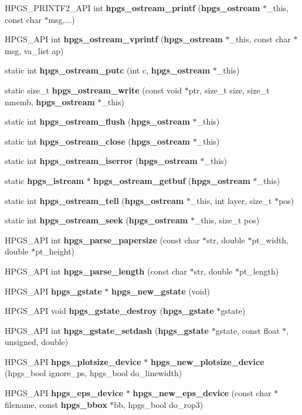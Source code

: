\begin{CompactItemize}
\item 
HPGS\_\-PRINTF2\_\-API int {\bf hpgs\_\-ostream\_\-printf} ({\bf hpgs\_\-ostream} $\ast$\_\-this, const char $\ast$msg,...)
\item 
HPGS\_\-API int {\bf hpgs\_\-ostream\_\-vprintf} ({\bf hpgs\_\-ostream} $\ast$\_\-this, const char $\ast$msg, va\_\-list ap)
\item 
static int {\bf hpgs\_\-ostream\_\-putc} (int c, {\bf hpgs\_\-ostream} $\ast$\_\-this)
\item 
static size\_\-t {\bf hpgs\_\-ostream\_\-write} (const void $\ast$ptr, size\_\-t size, size\_\-t nmemb, {\bf hpgs\_\-ostream} $\ast$\_\-this)
\item 
static int {\bf hpgs\_\-ostream\_\-flush} ({\bf hpgs\_\-ostream} $\ast$\_\-this)
\item 
static int {\bf hpgs\_\-ostream\_\-close} ({\bf hpgs\_\-ostream} $\ast$\_\-this)
\item 
static int {\bf hpgs\_\-ostream\_\-iserror} ({\bf hpgs\_\-ostream} $\ast$\_\-this)
\item 
static {\bf hpgs\_\-istream} $\ast$ {\bf hpgs\_\-ostream\_\-getbuf} ({\bf hpgs\_\-ostream} $\ast$\_\-this)
\item 
static int {\bf hpgs\_\-ostream\_\-tell} ({\bf hpgs\_\-ostream} $\ast$\_\-this, int layer, size\_\-t $\ast$pos)
\item 
static int {\bf hpgs\_\-ostream\_\-seek} ({\bf hpgs\_\-ostream} $\ast$\_\-this, size\_\-t pos)
\item 
HPGS\_\-API int {\bf hpgs\_\-parse\_\-papersize} (const char $\ast$str, double $\ast$pt\_\-width, double $\ast$pt\_\-height)
\item 
HPGS\_\-API int {\bf hpgs\_\-parse\_\-length} (const char $\ast$str, double $\ast$pt\_\-length)
\item 
HPGS\_\-API {\bf hpgs\_\-gstate} $\ast$ {\bf hpgs\_\-new\_\-gstate} (void)
\item 
HPGS\_\-API void {\bf hpgs\_\-gstate\_\-destroy} ({\bf hpgs\_\-gstate} $\ast$gstate)
\item 
HPGS\_\-API int {\bf hpgs\_\-gstate\_\-setdash} ({\bf hpgs\_\-gstate} $\ast$gstate, const float $\ast$, unsigned, double)
\item 
HPGS\_\-API {\bf hpgs\_\-plotsize\_\-device} $\ast$ {\bf hpgs\_\-new\_\-plotsize\_\-device} (hpgs\_\-bool ignore\_\-ps, hpgs\_\-bool do\_\-linewidth)
\item 
HPGS\_\-API {\bf hpgs\_\-eps\_\-device} $\ast$ {\bf hpgs\_\-new\_\-eps\_\-device} (const char $\ast$filename, const {\bf hpgs\_\-bbox} $\ast$bb, hpgs\_\-bool do\_\-rop3)

\end{CompactItemize}
